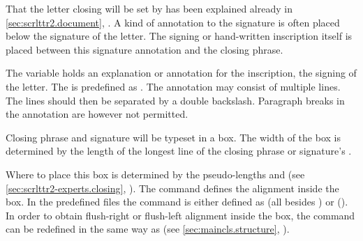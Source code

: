 That the letter closing will be set by  has
been explained already in \autoref{sec:scrlttr2.document},
. A kind of annotation to the signature
is often placed below the signature of the letter. The signing or hand-written
inscription itself is placed between this signature annotation and the closing
phrase.

\begin{Declaration}
\end{Declaration}
The variable  holds an explanation or annotation for the
inscription, the signing of the letter. The  is predefined as
.  The annotation may consist
of multiple lines. The lines should then be separated by a double
backslash. Paragraph breaks in the annotation are however
not permitted.%
\EndIndexGroup


\begin{Declaration}
\end{Declaration}
Closing phrase and signature will be typeset in a box. The width of
the box is determined by the length of the longest line of the closing
phrase or signature's .

Where to place this box is determined by the pseudo-lengths
 and
 (see
\autoref{sec:scrlttr2-experts.closing},
). The command
 defines the alignment inside the box. In the
predefined  files the command is either defined as 
(all besides ) or  ().  In
order to obtain flush-right or flush-left alignment inside the box, the
command can be redefined in the same way as  (see
\autoref{sec:maincls.structure},
).

